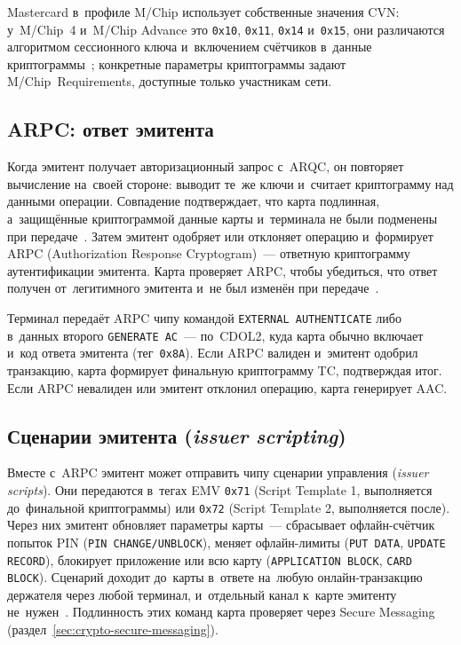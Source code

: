 Mastercard в~профиле M/Chip использует собственные значения CVN: у~M/Chip~4
и~M/Chip Advance это \texttt{0x10}, \texttt{0x11}, \texttt{0x14}
и~\texttt{0x15}, они различаются алгоритмом сессионного ключа и~включением
счётчиков в~данные криптограммы~\cite{thredd-chip-parameters}; конкретные
параметры криптограммы задают M/Chip~Requirements, доступные только участникам
сети.


\subsection*{ARPC: ответ эмитента}

Когда эмитент получает авторизационный запрос с~ARQC, он повторяет вычисление
на~своей стороне: выводит те~же ключи и~считает криптограмму над данными
операции. Совпадение подтверждает, что карта подлинная, а~защищённые
криптограммой данные карты и~терминала не были
подменены при передаче~\cite{visa-tadg}. Затем эмитент одобряет или отклоняет
операцию и~формирует ARPC (Authorization Response Cryptogram)~--- ответную
криптограмму аутентификации эмитента. Карта проверяет ARPC, чтобы убедиться, что
ответ получен от~легитимного эмитента и~не был изменён
при передаче~\cite{visa-tadg}.

Терминал передаёт ARPC чипу командой \texttt{EXTERNAL AUTHENTICATE} либо
в~данных второго \texttt{GENERATE AC}~--- по~CDOL2, куда карта обычно включает
и~код ответа эмитента (тег~\texttt{0x8A}). Если ARPC валиден и~эмитент одобрил транзакцию,
карта формирует финальную криптограмму TC, подтверждая итог. Если ARPC
невалиден или эмитент отклонил операцию, карта генерирует AAC.

\subsection*{Сценарии эмитента (\textit{issuer scripting})}

Вместе с~ARPC эмитент может отправить чипу сценарии управления (\textit{issuer
scripts}). Они передаются в~тегах EMV \texttt{0x71} (Script Template 1,
выполняется до~финальной криптограммы) или \texttt{0x72} (Script Template 2,
выполняется после). Через них эмитент обновляет параметры карты~--- сбрасывает
офлайн-счётчик попыток PIN (\texttt{PIN CHANGE/UNBLOCK}), меняет офлайн-лимиты
(\texttt{PUT DATA}, \texttt{UPDATE RECORD}), блокирует приложение или всю
карту (\texttt{APPLICATION BLOCK}, \texttt{CARD BLOCK}). Сценарий доходит
до~карты в~ответе на~любую онлайн-транзакцию держателя через любой терминал,
и~отдельный канал к~карте эмитенту не~нужен~\cite{emvco-book3}.
Подлинность этих команд карта проверяет через Secure Messaging
(раздел~\ref{sec:crypto-secure-messaging}).

